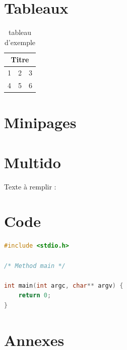 \documentclass[a4paper]{article}
\newcommand{\emptyLines}[1]{%
\multido{\iN=1+1}{#1}{\phantom{}\dotfill\newline}
}
\begin{document}

\section{Tableaux}

\begin{table}[!h] %
\begin{center}
	
\begin{tabular}{|c|c|c|}
	\hline
	\multicolumn{3}{|c|}{Titre} \\ \hline
	1	&	2	&	3 \\ \hline
	4	&	5	&	6 \\ \hline
\end{tabular}

\caption{tableau d'exemple}
\end{center}
\end{table}

\section{Minipages}
\hspace{0.5cm}%

\section{Multido}

Texte à remplir :

\emptyLines{10}

\section{Code}

\begin{lstlisting}[language=C,title=Code C,captionpos=b]
#include <stdio.h>
	
/* Method main */
	
int main(int argc, char** argv) {
	return 0;
}
\end{lstlisting}




\section*{Annexes} %
\end{document}
